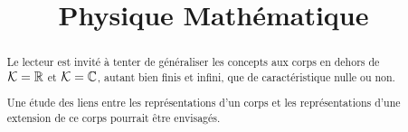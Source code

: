 \documentclass[a4paper, 12pt]{report}
\title{Physique Mathématique}
\author{}
\begin{document}
\maketitle

\begin{abstract}
	Le lecteur est invité à tenter de généraliser les concepts aux corps en
	dehors de $\mathcal{K} = \mathbb{R}$ et $\mathcal{K} = \mathbb{C}$, autant bien
	finis et infini, que de caractéristique nulle ou non.

	Une étude des liens entre les représentations d'un corps et les
	représentations d'une extension de ce corps pourrait être envisagés.
\end{abstract}

\tableofcontents



\end{document}
